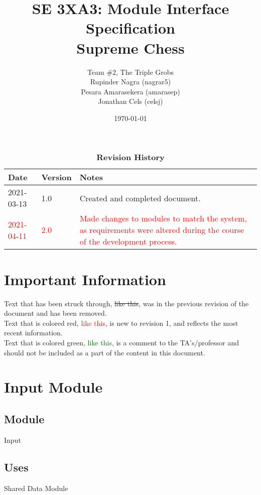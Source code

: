 \documentclass[12pt, titlepage]{article}
\title{SE 3XA3: Module Interface Specification\\Supreme Chess}
\author{Team \#2, The Triple Grobs
		\\ Rupinder Nagra (nagrar5)
		\\ Pesara Amarasekera (amarasep)
		\\ Jonathan Cels (celsj)
}
\date{\today}
\begin{document}
\maketitle

\newpage
\begin{table}[bp]
    \caption{\bf Revision History}
    \begin{tabularx}{\textwidth}{p{3cm}p{2cm}X}
    \toprule {\bf Date} & {\bf Version} & {\bf Notes}\\
    \midrule
    2021-03-13 & 1.0 & Created and completed document.\\
    \textcolor{red}{2021-04-11} & \textcolor{red}{2.0} & \textcolor{red}{Made changes to modules to match the system, as requirements were altered during the course of the development process.}\\
    \bottomrule
    \end{tabularx}
\end{table}


\section*{Important Information}
    Text that has been struck through, \sout{like this}, was in the previous revision of the document and has been removed. \\
    
    Text that is colored red, \textcolor{red}{like this}, is new to revision 1, and reflects the most recent information. \\
    
    Text that is colored green, \textcolor{darkgreen}{like this}, is a comment to the TA's/professor and should not be included as a part of the content in this document. \\

\newpage

\newpage
\section*{Input Module}
    \subsection*{Module}
        Input
    
    \subsection*{Uses}
        Shared Data Module
    
\end{document}
